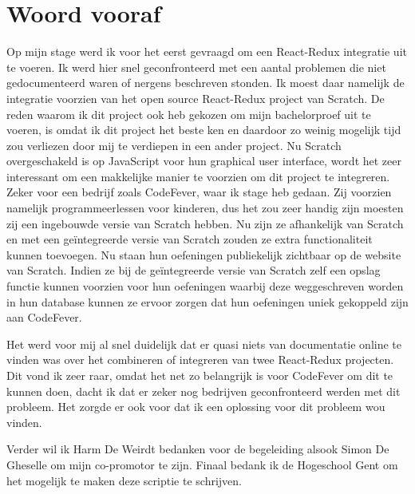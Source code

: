 
\chapter*{Woord vooraf}
\label{ch:voorwoord}


Op mijn stage werd ik voor het eerst gevraagd om een React-Redux integratie uit te voeren. Ik werd hier snel geconfronteerd met een aantal problemen die niet gedocumenteerd waren of nergens beschreven stonden. Ik moest daar namelijk de integratie voorzien van het open source React-Redux project van Scratch. De reden waarom ik dit project ook heb gekozen om mijn bachelorproef uit te voeren, is omdat ik dit project het beste ken en daardoor zo weinig mogelijk tijd zou verliezen door mij te verdiepen in een ander project. Nu Scratch overgeschakeld is op JavaScript voor hun graphical user interface, wordt het zeer interessant om een makkelijke manier te voorzien om dit project te integreren. Zeker voor een bedrijf zoals CodeFever, waar ik stage heb gedaan. Zij voorzien namelijk programmeerlessen voor kinderen, dus het zou zeer handig zijn moesten zij een ingebouwde versie van Scratch hebben. Nu zijn ze afhankelijk van Scratch en met een geïntegreerde versie van Scratch zouden ze extra functionaliteit kunnen toevoegen. Nu staan hun oefeningen publiekelijk zichtbaar op de website van Scratch. Indien ze bij de geïntegreerde versie van Scratch zelf een opslag functie kunnen voorzien voor hun oefeningen waarbij deze weggeschreven worden in hun database kunnen ze ervoor zorgen dat hun oefeningen uniek gekoppeld zijn aan CodeFever.

Het werd voor mij al snel duidelijk dat er quasi niets van documentatie online te vinden was over het combineren of integreren van twee React-Redux projecten. Dit vond ik zeer raar, omdat het net zo belangrijk is voor CodeFever om dit te kunnen doen, dacht ik dat er zeker nog bedrijven geconfronteerd werden met dit probleem. Het zorgde er ook voor dat ik een oplossing voor dit probleem wou vinden. 

Verder wil ik Harm De Weirdt bedanken voor de begeleiding alsook Simon De Gheselle om mijn co-promotor te zijn. Finaal bedank ik de Hogeschool Gent om het mogelijk te maken deze scriptie te schrijven.